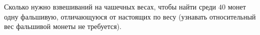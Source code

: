 Сколько нужно взвешиваний на чашечных весах, чтобы найти среди $40$ монет одну фальшивую, отличающуюся от
настоящих по весу (узнавать относительный вес фальшивой монеты не требуется).
